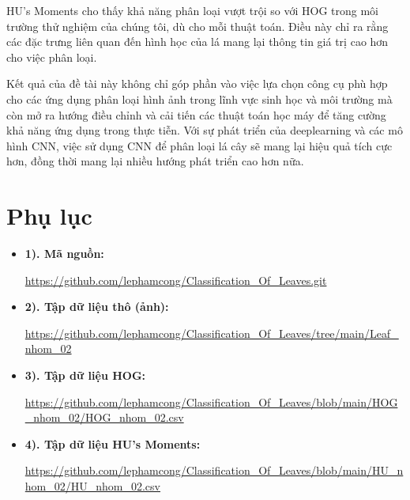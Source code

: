 \documentclass[a4paper]{article}
\begin{document}
HU's Moments cho thấy khả năng phân loại vượt trội so với HOG trong môi trường thử nghiệm của chúng tôi, dù cho mỗi thuật toán. Điều này chỉ ra rằng các đặc trưng liên quan đến hình học của lá mang lại thông tin giá trị cao hơn cho việc phân loại.

Kết quả của đề tài này không chỉ góp phần vào việc lựa chọn công cụ phù hợp cho các ứng dụng phân loại hình ảnh trong lĩnh vực sinh học và môi trường mà còn mở ra hướng điều chỉnh và cải tiến các thuật toán học máy để tăng cường khả năng ứng dụng trong thực tiễn. Với sự phát triển của deeplearning và các mô hình CNN, việc sử dụng CNN để phân loại lá cây sẽ mang lại hiệu quả tích cực hơn, đồng thời mang lại nhiều hướng phát triển cao hơn nữa. 

\section{Phụ lục}
\begin{itemize}[label={}]
    \item \textbf{1). Mã nguồn:} 
    
    \url{https://github.com/lephamcong/Classification_Of_Leaves.git}
    \item \textbf{2). Tập dữ liệu thô (ảnh):} 

    \url{https://github.com/lephamcong/Classification_Of_Leaves/tree/main/Leaf_nhom_02}
    
    \item \textbf{3). Tập dữ liệu HOG:}

    \url{https://github.com/lephamcong/Classification_Of_Leaves/blob/main/HOG_nhom_02/HOG_nhom_02.csv}

    \item \textbf{4). Tập dữ liệu HU's Moments:} 

    \url{https://github.com/lephamcong/Classification_Of_Leaves/blob/main/HU_nhom_02/HU_nhom_02.csv}
    
\end{itemize}
\newpage
{}
\end{document}
